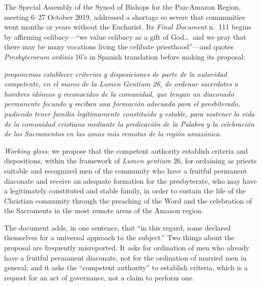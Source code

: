 The Special Assembly of the Synod of Bishops for the Pan-Amazon Region, meeting 6--27 October 2019, addressed a shortage so severe that communities went months or years without the Eucharist. Its \emph{Final Document} n.~111 begins by affirming celibacy---``we value celibacy as a gift of God\ldots\ and we pray that there may be many vocations living the celibate priesthood''---and quotes \emph{Presbyterorum ordinis} 16's  in Spanish translation before making its proposal:

\begin{studyframe}
\emph{proponemos establecer criterios y disposiciones de parte de la autoridad competente, en el marco de la Lumen Gentium 26, de ordenar sacerdotes a hombres idóneos y reconocidos de la comunidad, que tengan un diaconado permanente fecundo y reciban una formación adecuada para el presbiterado, pudiendo tener familia legítimamente constituída y estable, para sostener la vida de la comunidad cristiana mediante la predicación de la Palabra y la celebración de los Sacramentos en las zonas más remotas de la región amazónica.}

\emph{Working gloss:} we propose that the competent authority establish criteria and dispositions, within the framework of \emph{Lumen gentium} 26, for ordaining as priests suitable and recognized men of the community who have a fruitful permanent diaconate and receive an adequate formation for the presbyterate, who may have a legitimately constituted and stable family, in order to sustain the life of the Christian community through the preaching of the Word and the celebration of the Sacraments in the most remote areas of the Amazon region.
\end{studyframe}

The document adds, in one sentence, that ``in this regard, some declared themselves for a universal approach to the subject.'' Two things about the proposal are frequently misreported. It asks for ordination of men who already have a fruitful permanent diaconate, not for the ordination of married men in general; and it asks the ``competent authority'' to establish criteria, which is a request for an act of governance, not a claim to perform one.

